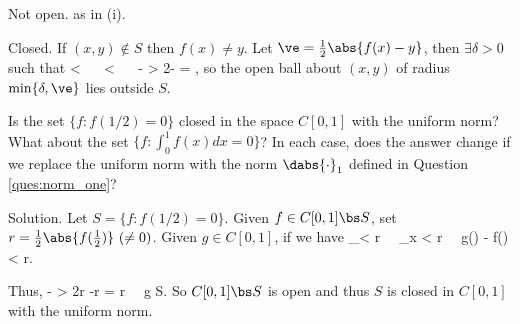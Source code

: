\item [(vi)] Not open. as in (i). 

Closed. If $(x,y)\not\in S$ then $f(x) \neq y$. Let $\ve=\frac 12 \abs{f(x)-y}$, then $\exists \delta >0$ such that
\be
{}< \delta \ \ra \  < \ve \ \ra \  \geq {}- > 2\ve - \ve = \ve,
\ee
so the open ball about $(x,y)$ of radius $\min\{\delta, \ve\}$ lies outside $S$.


\een

\begin{exercise}
Is the set $\{f : f(1/2) = 0\}$ closed in the space $C[0, 1]$ with the uniform norm? What about the set $\{f : \int^1_0 f(x)dx = 0\}$? In each case, does the answer change if we replace the uniform norm with the norm $\dabs{\cdot}_1$ defined in Question \ref{ques:norm_one}?
\end{exercise}

Solution. Let $S=\{f : f(1/2) = 0\}$. Given $f\in C[0,1]\bs S$, set $r = \frac 12 \abs{f(\tfrac 12)} \ (\neq 0)$. Given $g\in C[0,1]$, if we have
\be
{}_\infty < r \ \ra \ \sup_{x\in [0,1]} < r \ \ra \ g() - f() < r.
\ee

Thus,
\be
{}  \geq {} -  > 2r -r = r \ \ra \ g \notin S.
\ee
So $C[0,1]\bs S$ is open and thus $S$ is closed in $C[0,1]$ with the uniform norm.

